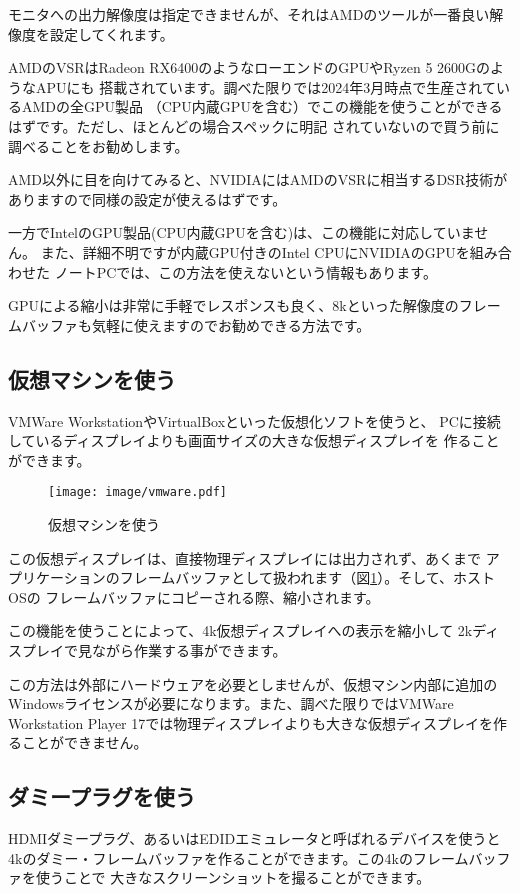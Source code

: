 モニタへの出力解像度は指定できませんが、それはAMDのツールが一番良い解像度を設定してくれます。


AMDのVSRはRadeon RX6400のようなローエンドのGPUやRyzen 5 2600GのようなAPUにも
搭載されています。調べた限りでは2024年3月時点で生産されているAMDの全GPU製品
（CPU内蔵GPUを含む）でこの機能を使うことができるはずです。ただし、ほとんどの場合スペックに明記
されていないので買う前に調べることをお勧めします。

AMD以外に目を向けてみると、NVIDIAにはAMDのVSRに相当するDSR技術がありますので同様の設定が使えるはずです。

一方でIntelのGPU製品(CPU内蔵GPUを含む)は、この機能に対応していません。
また、詳細不明ですが内蔵GPU付きのIntel CPUにNVIDIAのGPUを組み合わせた
ノートPCでは、この方法を使えないという情報もあります。

GPUによる縮小は非常に手軽でレスポンスも良く、8kといった解像度のフレームバッファも気軽に使えますのでお勧めできる方法です。

\subsection{仮想マシンを使う}
VMWare WorkstationやVirtualBoxといった仮想化ソフトを使うと、
PCに接続しているディスプレイよりも画面サイズの大きな仮想ディスプレイを
作ることができます。

\begin{figure}[btp]
  \begin{center}
    \texttt{[image: image/vmware.pdf]}
    \caption{仮想マシンを使う} \label{fig:vm}
  \end{center}
\end{figure}


この仮想ディスプレイは、直接物理ディスプレイには出力されず、あくまで
アプリケーションのフレームバッファとして扱われます（図\ref{fig:vm}）。そして、ホストOSの
フレームバッファにコピーされる際、縮小されます。

この機能を使うことによって、4k仮想ディスプレイへの表示を縮小して
2kディスプレイで見ながら作業する事ができます。

この方法は外部にハードウェアを必要としませんが、仮想マシン内部に追加の
Windowsライセンスが必要になります。また、調べた限りではVMWare Workstation
Player 17では物理ディスプレイよりも大きな仮想ディスプレイを作ることができません。


\subsection{ダミープラグを使う}
HDMIダミープラグ、あるいはEDIDエミュレータと呼ばれるデバイスを使うと
4kのダミー・フレームバッファを作ることができます。この4kのフレームバッファを使うことで
大きなスクリーンショットを撮ることができます。

